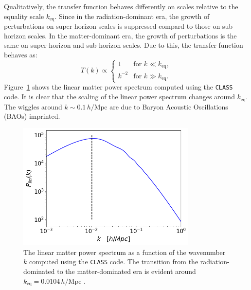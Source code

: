 Qualitatively, the transfer function behaves differently on scales relative to
the equality scale \( k_{\text{eq}} \).
Since in the radiation-dominant era, the growth of perturbations on super-horizon scales is suppressed compard to those on sub-horizon scales. In the matter-dominant era, the growth of perturbations is the same on super-horizon and sub-horizon scales. Due to this, the transfer function behaves as:
\begin{equation}
    T(k) \propto 
    \begin{cases}
        1 & \text{for } k \ll k_{\text{eq}}, \\
        k^{-2} & \text{for } k \gg k_{\text{eq}}.
    \end{cases}
\end{equation}
Figure~\ref{fig:linear_power_spectrum} shows the linear matter power spectrum computed using the \texttt{CLASS} code. It is clear that the scaling of the linear power spectrum changes around $k_{\text{eq}}$. The wiggles around \( k \sim 0.1\, h/\text{Mpc} \) are due to Baryon Acoustic Oscillations (BAOs) imprinted.
\begin{figure}[ht]
    \centering
    \includegraphics[width=0.8\textwidth]{figures/class.png}
    \caption[Linear Matter Power Spectrum by \texttt{CLASS}]{The linear matter power spectrum as a function of the wavenumber \( k \) computed using the \texttt{CLASS} code. The transition from the radiation-dominated to the matter-dominated era is evident around \( k_{\text{eq}} = 0.0104\, h/\text{Mpc} \) \citep{2020A&A...641A...6P}.
    }
    \label{fig:linear_power_spectrum}
\end{figure}


